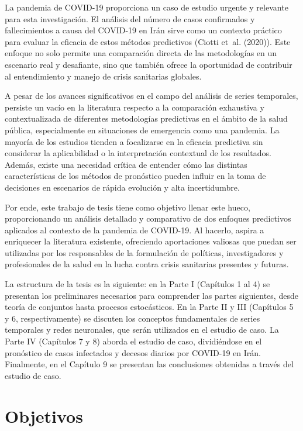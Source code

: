 \documentclass[
  us-letterpaper,
]{scrreprt}
\theoremstyle{plain}
\theoremstyle{definition}
\theoremstyle{definition}
\theoremstyle{plain}
\theoremstyle{remark}
\begin{document}
La pandemia de COVID-19 proporciona un caso de estudio urgente y
relevante para esta investigación. El análisis del número de casos
confirmados y fallecimientos a causa del COVID-19 en Irán sirve como un
contexto práctico para evaluar la eficacia de estos métodos predictivos
(Ciotti et~al. (2020)). Este enfoque no solo permite una comparación
directa de las metodologías en un escenario real y desafiante, sino que
también ofrece la oportunidad de contribuir al entendimiento y manejo de
crisis sanitarias globales.

A pesar de los avances significativos en el campo del análisis de series
temporales, persiste un vacío en la literatura respecto a la comparación
exhaustiva y contextualizada de diferentes metodologías predictivas en
el ámbito de la salud pública, especialmente en situaciones de
emergencia como una pandemia. La mayoría de los estudios tienden a
focalizarse en la eficacia predictiva sin considerar la aplicabilidad o
la interpretación contextual de los resultados. Además, existe una
necesidad crítica de entender cómo las distintas características de los
métodos de pronóstico pueden influir en la toma de decisiones en
escenarios de rápida evolución y alta incertidumbre.

Por ende, este trabajo de tesis tiene como objetivo llenar este hueco,
proporcionando un análisis detallado y comparativo de dos enfoques
predictivos aplicados al contexto de la pandemia de COVID-19. Al
hacerlo, aspira a enriquecer la literatura existente, ofreciendo
aportaciones valiosas que puedan ser utilizadas por los responsables de
la formulación de políticas, investigadores y profesionales de la salud
en la lucha contra crisis sanitarias presentes y futuras.

La estructura de la tesis es la siguiente: en la Parte I (Capítulos 1 al
4) se presentan los preliminares necesarios para comprender las partes
siguientes, desde teoría de conjuntos hasta procesos estocásticos. En la
Parte II y III (Capítulos 5 y 6, respectivamente) se discuten los
conceptos fundamentales de series temporales y redes neuronales, que
serán utilizados en el estudio de caso. La Parte IV (Capítulos 7 y 8)
aborda el estudio de caso, dividiéndose en el pronóstico de casos
infectados y decesos diarios por COVID-19 en Irán. Finalmente, en el
Capítulo 9 se presentan las conclusiones obtenidas a través del estudio
de caso.


\chapter*{Objetivos}\label{objetivos}
\end{document}
